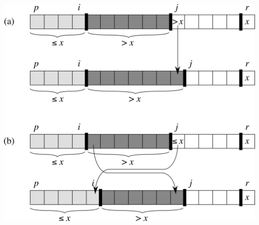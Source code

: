 \documentclass{beamer}
\newcommand{\sect}[1]{
\section{#1}
\begin{frame}[fragile]\frametitle{#1}
}
\begin{document}
\sect{}
  \includegraphics[height=0.9\textheight]{Fig-7-3.pdf}
\end{frame}
\end{document}
